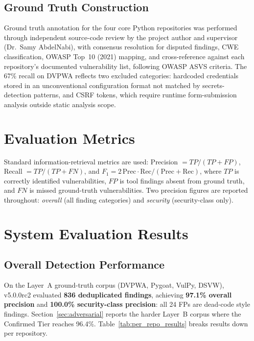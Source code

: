 \subsection{Ground Truth Construction}

Ground truth annotation for the four core Python repositories was performed through independent source-code review by the project author and supervisor (Dr.\ Samy AbdelNabi), with consensus resolution for disputed findings, CWE classification, OWASP Top~10 (2021) mapping, and cross-reference against each repository's documented vulnerability list, following OWASP ASVS \cite{owasp_asvs} criteria. The 67\% recall on DVPWA reflects two excluded categories: hardcoded credentials stored in an unconventional configuration format not matched by secrets-detection patterns, and CSRF tokens, which require runtime form-submission analysis outside static analysis scope.

\section{Evaluation Metrics}
\label{sec:metrics}

Standard information-retrieval metrics are used: Precision $= TP / (TP+FP)$, Recall $= TP / (TP+FN)$, and $F_1 = 2\,\text{Prec}\cdot\text{Rec}/(\text{Prec}+\text{Rec})$, where $TP$ is correctly identified vulnerabilities, $FP$ is tool findings absent from ground truth, and $FN$ is missed ground-truth vulnerabilities. Two precision figures are reported throughout: \textit{overall} (all finding categories) and \textit{security} (security-class only).

\section{System Evaluation Results}
\label{sec:system_results}

\subsection{Overall Detection Performance}

On the Layer~A ground-truth corpus (DVPWA, Pygoat, VulPy, DSVW), \ACRQA{} v5.0.0rc2 evaluated \textbf{836 deduplicated findings}, achieving \textbf{97.1\% overall precision} and \textbf{100.0\% security-class precision}: all 24 FPs are dead-code style findings. Section~\ref{sec:adversarial} reports the harder Layer~B corpus where the Confirmed Tier reaches 96.4\%. Table~\ref{tab:per_repo_results} breaks results down per repository.

